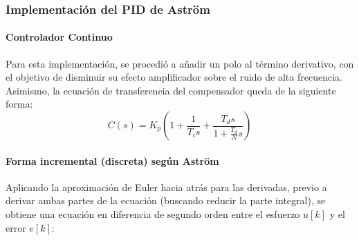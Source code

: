 

\subsubsection{Implementación del PID de Astr\"om}

\paragraph{Controlador Continuo}
Para esta implementación, se procedió a añadir un polo al término derivativo, con el objetivo de disminuir su efecto amplificador sobre el ruido de alta frecuencia. Asimismo, la ecuación de transferencia del compensador queda de la siguiente forma:
\begin{equation}
	C(s)=K_p\left(1+\frac{1}{T_is}+\frac{T_ds}{1+\frac{T_d}{N}s}\right)
\end{equation}

\paragraph{Forma incremental (discreta) según Astr\"om}
Aplicando la aproximación de Euler hacia atrás para las derivadas, previo a derivar ambas partes de la ecuación (buscando reducir la parte integral), se obtiene una ecuación en diferencia de segundo orden entre el esfuerzo \(u[k]\) y el error \(e[k]\):


